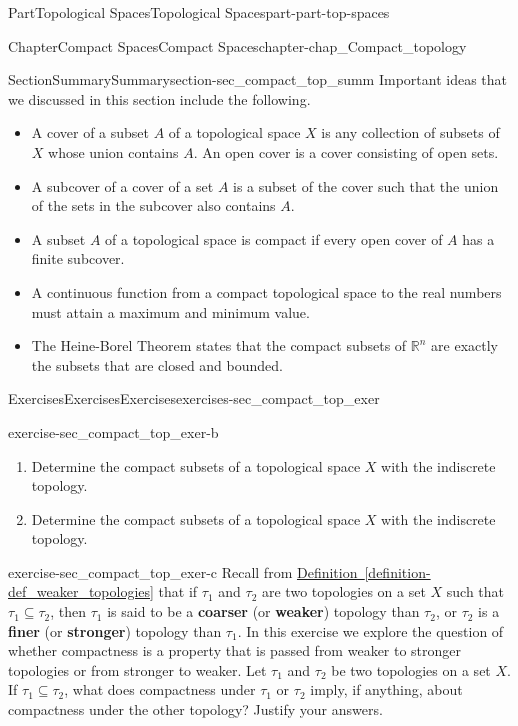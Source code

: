 \documentclass[oneside,10pt,]{book}
\newcommand{\xreffont}{\relax}
\newcommand{\terminology}[1]{\textbf{#1}}
\numberwithin{equation}{chapter}
\newcommand{\R}{\mathbb{R}}
\begin{document}
\begin{partptx}{Part}{Topological Spaces}{}{Topological Spaces}{}{}{part-part-top-spaces}
\begin{chapterptx}{Chapter}{Compact Spaces}{}{Compact Spaces}{}{}{chapter-chap_Compact_topology}
\begin{sectionptx}{Section}{Summary}{}{Summary}{}{}{section-sec_compact_top_summ}
Important ideas that we discussed in this section include the following.%
\begin{itemize}[label=\textbullet]
\item{}A cover of a subset \(A\) of a topological space \(X\) is any collection of subsets of \(X\) whose union contains \(A\). An open cover is a cover consisting of open sets.%
\item{}A subcover of a cover of a set \(A\) is a subset of the cover such that the union of the sets in the subcover also contains \(A\).%
\item{}A subset \(A\) of a topological space is compact if every open cover of \(A\) has a finite subcover.%
\item{}A continuous function from a compact topological space to the real numbers must attain a maximum and minimum value.%
\item{}The Heine-Borel Theorem states that the compact subsets of \(\R^n\) are exactly the subsets that are closed and bounded.%
\end{itemize}
%
\end{sectionptx}
%
%
\typeout{************************************************}
\typeout{************************************************}
%
\begin{exercises-section}{Exercises}{Exercises}{}{Exercises}{}{}{exercises-sec_compact_top_exer}
\begin{divisionexercise}{1}{}{}{exercise-sec_compact_top_exer-b}%
\begin{enumerate}[font=\bfseries,label=(\alph*),ref=\alph*]%
\item{}Determine the compact subsets of a topological space \(X\) with the indiscrete topology.%
\item{}Determine the compact subsets of a topological space \(X\) with the indiscrete topology.%
\end{enumerate}%
\end{divisionexercise}%
\begin{divisionexercise}{2}{}{}{exercise-sec_compact_top_exer-c}%
Recall from \hyperref[definition-def_weaker_topologies]{Definition~{\xreffont\ref{definition-def_weaker_topologies}}} that if \(\tau_1\) and \(\tau_2\) are two topologies on a set \(X\) such that \(\tau_1 \subseteq \tau_2\), then \(\tau_1\) is said to be a \terminology{coarser} (or \terminology{weaker}) topology than \(\tau_2\), or \(\tau_2\) is a \terminology{finer} (or \terminology{stronger}) topology than \(\tau_1\). In this exercise we explore the question of whether compactness is a property that is passed from weaker to stronger topologies or from stronger to weaker. Let \(\tau_1\) and \(\tau_2\) be two topologies on a set \(X\). If \(\tau_1 \subseteq \tau_2\), what does compactness under \(\tau_1\) or \(\tau_2\) imply, if anything, about compactness under the other topology? Justify your answers.%

\end{divisionexercise}
\end{exercises-section}
\end{chapterptx}
\end{partptx}
\end{document}
